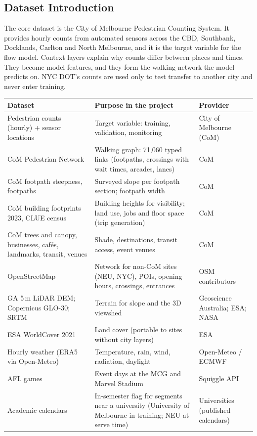 \documentclass[11pt]{article}
\newcommand{\hrow}{\rowcolor{headgray}}
\begin{document}
\subsection{Dataset Introduction}

The core dataset is the City of Melbourne Pedestrian Counting System. It provides hourly counts from automated sensors across the CBD, Southbank, Docklands, Carlton and North Melbourne, and it is the target variable for the flow model. Context layers explain why counts differ between places and times. They become model features, and they form the walking network the model predicts on. NYC DOT's counts are used only to test transfer to another city and never enter training.

\begin{xltabular}{\linewidth}{|L{3.6cm}|Y|L{3.4cm}|}
\hline\hrow
\textbf{Dataset} & \textbf{Purpose in the project} & \textbf{Provider} \\\hline
\endhead
Pedestrian counts (hourly) + sensor locations & Target variable: training, validation, monitoring & City of Melbourne (CoM) \\\hline
CoM Pedestrian Network & Walking graph: 71,060 typed links (footpaths, crossings with wait times, arcades, lanes) & CoM \\\hline
CoM footpath steepness, footpaths & Surveyed slope per footpath section; footpath width & CoM \\\hline
CoM building footprints 2023, CLUE census & Building heights for visibility; land use, jobs and floor space (trip generation) & CoM \\\hline
CoM trees and canopy, businesses, cafés, landmarks, transit, venues & Shade, destinations, transit access, event venues & CoM \\\hline
OpenStreetMap & Network for non-CoM sites (NEU, NYC), POIs, opening hours, crossings, entrances & OSM contributors \\\hline
GA 5\,m LiDAR DEM; Copernicus GLO-30; SRTM & Terrain for slope and the 3D viewshed & Geoscience Australia; ESA; NASA \\\hline
ESA WorldCover 2021 & Land cover (portable to sites without city layers) & ESA \\\hline
Hourly weather (ERA5 via Open-Meteo) & Temperature, rain, wind, radiation, daylight & Open-Meteo / ECMWF \\\hline
AFL games & Event days at the MCG and Marvel Stadium & Squiggle API \\\hline
Academic calendars & In-semester flag for segments near a university (University of Melbourne in training; NEU at serve time) & Universities (published calendars) \\\hline

\end{xltabular}
\end{document}
